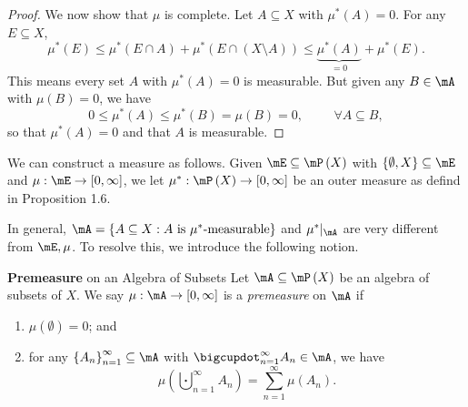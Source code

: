 \documentclass[pmath451]{subfiles}
\begin{document}
\begin{proof}
        We now show that $\mu$ is complete. Let $A\subseteq X$ with $\mu^{*}\left( A \right) = 0$. For any $E\subseteq X$,
        \begin{equation*}
            \mu^{*}\left( E \right)\leq \mu^{*}\left( E\cap A \right)+\mu^{*}\left( E\cap \left( X\setminus A \right) \right) \leq \underbrace{\mu^{*}\left( A \right)}_{=0} + \mu^{*}\left( E \right).
        \end{equation*}
        This means every set $A$ with $\mu^{*}\left( A \right) = 0$ is measurable. But given any $B\in\mA$ with $\mu\left( B \right) = 0$, we have
        \begin{equation*}
            0\leq \mu^{*}\left( A \right) \leq \mu^{*}\left( B \right) = \mu\left( B \right) = 0,\hspace{1cm}\forall A\subseteq B,
        \end{equation*}
        so that $\mu^{*}\left( A \right) = 0$ and that $A$ is measurable.
    \end{proof}

    \np We can construct a measure as follows. Given $\mE\subseteq\mP\left( X \right)$ with $\left\lbrace \emptyset,X \right\rbrace\subseteq\mE$ and $\mu:\mE\to\left[ 0,\infty \right]$, we let $\mu^{*}:\mP\left( X \right)\to\left[ 0,\infty \right]$ be an outer measure as defind in Proposition 1.6. 

    In general, $\mA = \left\lbrace A\subseteq X: \text{$A$ is $\mu^{*}$-measurable} \right\rbrace$ and $\mu^{*}|_{\mA}$ are very different from $\mE, \mu$. To resolve this, we introduce the following notion.

    \begin{definition}{\textbf{Premeasure} on an Algebra of Subsets}
        Let $\mA\subseteq\mP\left( X \right)$ be an algebra of subsets of $X$. We say $\mu:\mA\to\left[ 0,\infty \right]$ is a \emph{premeasure} on $\mA$ if
        \begin{enumerate}
            \item $\mu\left( \emptyset \right) = 0$; and
            \item for any $\left\lbrace A_n \right\rbrace^{\infty}_{n=1}\subseteq\mA$ with $\bigcupdot^{\infty}_{n=1}A_n\in\mA$, we have
                \begin{equation*}
                    \mu\left( \bigcupdot^{\infty}_{n=1}A_n \right) = \sum^{\infty}_{n=1}\mu\left( A_n \right).
                \end{equation*}
        \end{enumerate}
    \end{definition}
    
\end{document}
